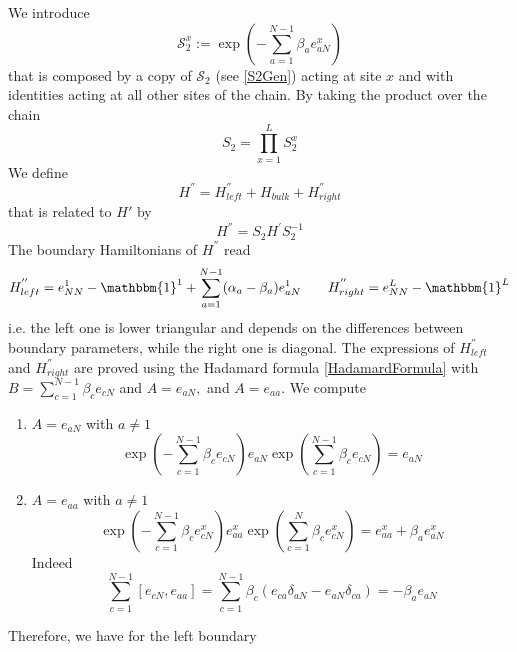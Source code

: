 \documentclass[10pt]{article}
\numberwithin{equation}{section}
\numberwithin{equation}{subsection}
\begin{document}
We introduce
 \begin{equation}
 	\mathcal{S}_{2}^{x}:=\exp{\left(-\sum_{a=1}^{N-1}\beta_{a}e_{aN}^{x}\right)}%
 \end{equation}
that is composed by a copy of $\mathcal{S}_{2}$ (see \eqref{S2Gen}) acting at site $x$ and with identities acting at all other sites of the chain. 
By taking the product over the chain
\begin{equation}\label{S2-Whole}
	S_{2}=\prod_{x=1}^{L}S_{2}^{x}
\end{equation}
We define 
\begin{equation}\label{HSecond}
	H^{''}=H_{left}^{''}+H_{bulk}+H_{right}^{''}
\end{equation}
that is related to $H'$ by
\begin{equation}
	H^{''}=S_{2}H^{'}S_{2}^{-1}
\end{equation}
The boundary Hamiltonians of $H^{''}$ read
\begin{align}
	H_{left}^{''}=e_{NN}^{1}-\mathbbm{1}^{1}+\sum_{a=1}^{N-1}(\alpha_{a}-\beta_{a})e_{aN}^{1}\qquad H_{right}^{''}=e_{NN}^{L}-\mathbbm{1}^{L}
\end{align}
i.e. the left one is lower triangular and depends on the differences between boundary parameters, while the right one is diagonal. The expressions of $H_{left}^{''}$ and $H_{right}^{''}$ are proved using the Hadamard formula \eqref{HadamardFormula} with $B=\sum_{c=1}^{N-1}\beta_{c}e_{cN}$ and $A=e_{aN},$ and $A=e_{aa}$. We compute
\begin{enumerate}
	\item $A=e_{aN}$ with $a\neq 1$
	\begin{equation}
		\exp{\left(-\sum_{c=1}^{N-1}\beta_{c}e_{cN}\right)}e_{aN}\exp{\left(\sum_{c=1}^{N-1}\beta_{c}e_{cN}\right)}=e_{aN}
	\end{equation}
\item $A=e_{aa}$ with $a\neq 1$
\begin{equation}
		\exp{\left(-\sum_{c=1}^{N-1}\beta_{c}e_{cN}^{x}\right)}e_{aa}^{x}\exp{\left(\sum_{c=1}^{N}\beta_{c}e_{cN}^{x}\right)}=e_{aa}^{x}+\beta_{a}e_{aN}^{x}
	\end{equation}
Indeed 
\begin{equation}
	\sum_{c=1}^{N-1}[e_{cN},e_{aa}]=\sum_{c=1}^{N-1}\beta_{c}\left(e_{ca}\delta_{aN}-e_{aN}\delta_{ca}\right)=-\beta_{a}e_{aN}
\end{equation}
\end{enumerate}
Therefore, we have for the left boundary
\end{document}

